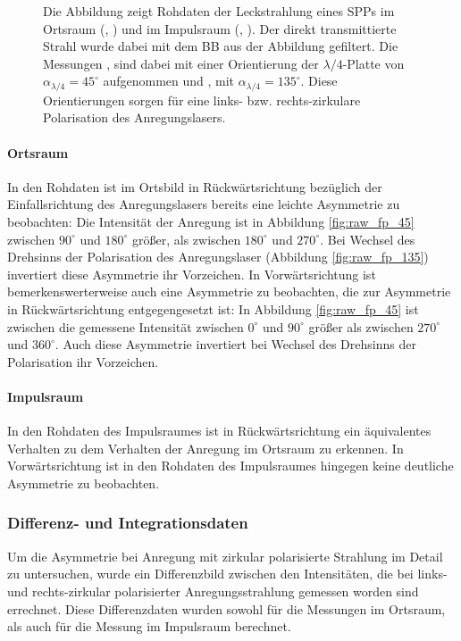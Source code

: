 \documentclass[titlepage,  ngerman]{article}
\begin{document}
\begin{figure}
\begin{subfigure}[b]{0.5\textwidth}
		\end{subfigure}
		\caption[Rohdaten PSHE]{Die Abbildung zeigt Rohdaten der Leckstrahlung eines SPPs im Ortsraum (, ) und im Impulsraum (, ). Der direkt transmittierte Strahl wurde dabei mit dem BB aus der Abbildung gefiltert. Die Messungen ,  sind dabei mit einer Orientierung der $\lambda / 4$-Platte von $\alpha_{\lambda/4} = 45^\circ$ aufgenommen und ,  mit $\alpha_{\lambda/4} = 135^\circ$. Diese Orientierungen sorgen für eine links- bzw. rechts-zirkulare Polarisation des Anregungslasers.}
		\label{fig:measure_pshe_raw}			
	\end{figure}
	\paragraph{Ortsraum}
	In den Rohdaten ist im Ortsbild in Rückwärtsrichtung bezüglich der Einfallsrichtung des Anregungslasers bereits eine leichte Asymmetrie zu beobachten: Die Intensität der Anregung ist in Abbildung \ref{fig:raw_fp_45} zwischen $90^\circ$ und $180^\circ$ größer, als zwischen $180^\circ$ und $270^\circ$. Bei Wechsel des Drehsinns der Polarisation des Anregungslaser (Abbildung \ref{fig:raw_fp_135}) invertiert diese Asymmetrie ihr Vorzeichen. In Vorwärtsrichtung ist bemerkenswerterweise auch eine Asymmetrie zu beobachten, die zur Asymmetrie in Rückwärtsrichtung entgegengesetzt ist: In Abbildung \ref{fig:raw_fp_45} ist zwischen die gemessene Intensität zwischen $0^\circ$ und $90^\circ$ größer als zwischen $270^\circ$ und $360^\circ$. Auch diese Asymmetrie invertiert bei Wechsel des Drehsinns der Polarisation ihr Vorzeichen.
	\paragraph{Impulsraum} 
	In den Rohdaten des Impulsraumes ist in Rückwärtsrichtung ein äquivalentes Verhalten zu dem Verhalten der Anregung im Ortsraum zu erkennen. In Vorwärtsrichtung ist in den Rohdaten des Impulsraumes hingegen keine deutliche Asymmetrie zu beobachten.
	\FloatBarrier
	\subsubsection{Differenz- und Integrationsdaten}
		Um die Asymmetrie bei Anregung mit zirkular polarisierte Strahlung im Detail zu untersuchen, wurde ein Differenzbild zwischen den Intensitäten, die bei links- und rechts-zirkular polarisierter Anregungsstrahlung gemessen worden sind errechnet. Diese Differenzdaten wurden sowohl für die Messungen im Ortsraum, als auch für die Messung im Impulsraum berechnet.			
\end{document}
